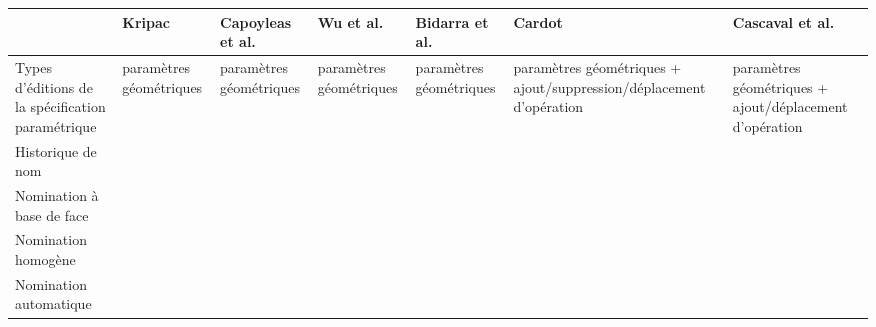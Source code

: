 \begin{table}
	\centering
	\small
	\begin{tabularx}{\textwidth}{|p{4.55cm}||Y|Y|Y|Y|Y|Y|}
		\bottomrule%
		 & Kripac                  & Capoyleas et al.        & Wu et al.               & Bidarra et al.          & Cardot                                                              & Cascaval et al.                                         \\
		\toprule %
		\bottomrule %
		 Types d'éditions de la spécification paramétrique                                    & paramètres géométriques & paramètres géométriques & paramètres géométriques & paramètres géométriques & paramètres géométriques + ajout/suppression/déplacement d'opération & paramètres géométriques + ajout/déplacement d'opération \\
		\hline
		Historique de nom                                                                    & \cmark                  & \cmark                  & \cmark                  & \xmark                  & \cmark                                                              & \cmark                                                  \\
		\hline
		Nomination  à base de face                                                           & \cmark                  & \cmark                  & \cmark                  & \cmark                  & \xmark                                                              & \xmark                                                  \\
		\hline
		Nomination  homogène                                                                 & \xmark                  & \xmark                  & \xmark                  & \xmark                  & \cmark                                                              & \cmark                                                  \\
		\hline
		Nomination  automatique                                                              & \cmark                  & \cmark                  & \cmark                  & \cmark                  & \cmark                                                              & \xmark                                                  \\

\end{tabularx}
\end{table}
